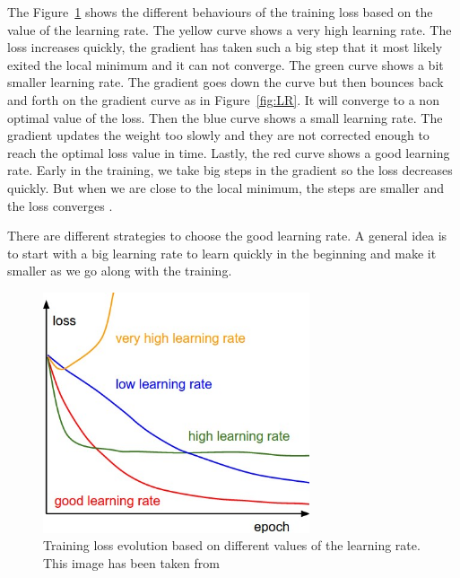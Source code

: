 The Figure~\ref{fig:LR_impact} shows the different behaviours of the training loss based on the value of the learning rate. The yellow curve shows a very high learning rate. The loss increases quickly, the gradient has taken such a big step that it most likely exited the local minimum and it can not converge. The green curve shows a bit smaller learning rate. The gradient goes down the curve but then bounces back and forth on the gradient curve as in Figure~\ref{fig:LR}. It will converge to a non optimal value of the loss. Then the blue curve shows a small learning rate. The gradient updates the weight too slowly and they are not corrected enough to reach the optimal loss value in time. Lastly, the red curve shows a good learning rate. Early in the training, we take big steps in the gradient so the loss decreases quickly. But when we are close to the local minimum, the steps are smaller and the loss converges \cite{lr}. 

There are different strategies to choose the good learning rate. A general idea is to start with a big learning rate to learn quickly in the beginning and make it smaller as we go along with the training. 
\begin{figure}[!htp]
    \centering
        \includegraphics[width=0.7\textwidth]{figures/02-LR_impatc_train}
        \caption[Impact of the learning rate on training]{Training loss evolution based on different values of the learning rate. This image has been taken from \cite{cs231n}}\label{fig:LR_impact}
\end{figure}

